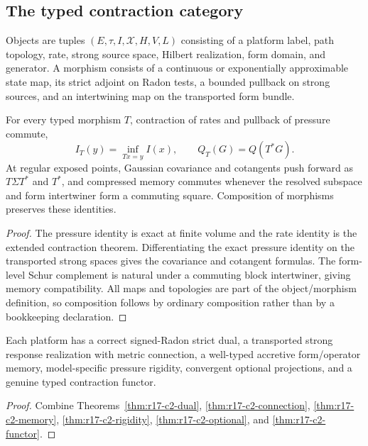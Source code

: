 \subsection{The typed contraction category}

Objects are tuples
$(E,\tau, I,\mathscr X, H, V, L)$ consisting of a
platform label, path topology, rate, strong source space, Hilbert realization,
form domain, and generator.  A morphism consists of a continuous or
exponentially approximable state map, its strict adjoint on Radon tests, a
bounded pullback on strong sources, and an intertwining map on the transported
form bundle.

\begin{theorem}
\label{thm:r17-c2-functor}
For every typed morphism $T$, contraction of rates and pullback of pressure
commute,
\[
 I_T(y)=\inf_{Tx=y}I(x),
 \qquad Q_T(G)=Q(T^*G).
\]
At regular exposed points, Gaussian covariance and cotangents push forward as
$T\Sigma T^*$ and $T^*$, and compressed memory commutes whenever the
resolved subspace and form intertwiner form a commuting square.  Composition
of morphisms preserves these identities.
\end{theorem}

\begin{proof}
The pressure identity is exact at finite volume and the rate identity is the
extended contraction theorem.  Differentiating the exact pressure identity on
the transported strong spaces gives the covariance and cotangent formulas.
The form-level Schur complement is natural under a commuting block
intertwiner, giving memory compatibility.  All maps and topologies are part of
the object/morphism definition, so composition follows by ordinary
composition rather than by a bookkeeping declaration.
\end{proof}

\begin{theorem}
\label{thm:r17-c2-main}
Each platform has a correct signed-Radon strict dual, a transported strong
response realization with metric connection, a well-typed accretive
form/operator memory, model-specific pressure rigidity, convergent optional
projections, and a genuine typed contraction functor.
\end{theorem}

\begin{proof}
Combine Theorems~\ref{thm:r17-c2-dual},
\ref{thm:r17-c2-connection}, \ref{thm:r17-c2-memory},
\ref{thm:r17-c2-rigidity}, \ref{thm:r17-c2-optional}, and
\ref{thm:r17-c2-functor}.
\end{proof}
